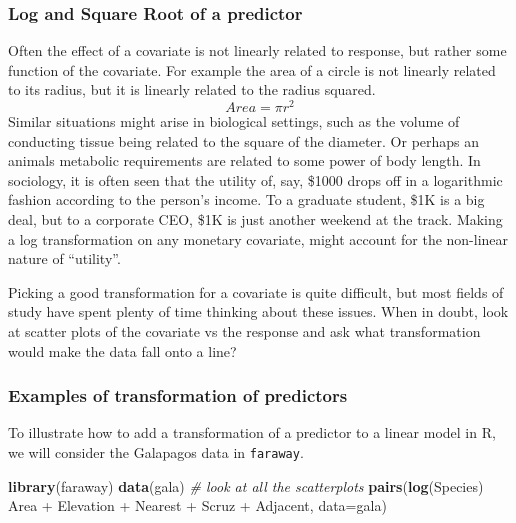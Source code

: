 \documentclass[]{book}
\newenvironment{Shaded}{\begin{snugshade}}{\end{snugshade}}
\newcommand{\KeywordTok}[1]{\textcolor[rgb]{0.13,0.29,0.53}{\textbf{{#1}}}}
\newcommand{\DataTypeTok}[1]{\textcolor[rgb]{0.13,0.29,0.53}{{#1}}}
\newcommand{\StringTok}[1]{\textcolor[rgb]{0.31,0.60,0.02}{{#1}}}
\newcommand{\CommentTok}[1]{\textcolor[rgb]{0.56,0.35,0.01}{\textit{{#1}}}}
\newcommand{\NormalTok}[1]{{#1}}
\theoremstyle{definition}
\theoremstyle{definition}
\theoremstyle{remark}
\begin{document}
\subsubsection{Log and Square Root of a
predictor}\label{log-and-square-root-of-a-predictor}

Often the effect of a covariate is not linearly related to response, but
rather some function of the covariate. For example the area of a circle
is not linearly related to its radius, but it is linearly related to the
radius squared. \[Area=\pi r^{2}\] Similar situations might arise in
biological settings, such as the volume of conducting tissue being
related to the square of the diameter. Or perhaps an animals metabolic
requirements are related to some power of body length. In sociology, it
is often seen that the utility of, say, \$1000 drops off in a
logarithmic fashion according to the person's income. To a graduate
student, \$1K is a big deal, but to a corporate CEO, \$1K is just
another weekend at the track. Making a log transformation on any
monetary covariate, might account for the non-linear nature of
``utility''.

Picking a good transformation for a covariate is quite difficult, but
most fields of study have spent plenty of time thinking about these
issues. When in doubt, look at scatter plots of the covariate vs the
response and ask what transformation would make the data fall onto a
line?

\subsubsection{Examples of transformation of
predictors}\label{examples-of-transformation-of-predictors}

To illustrate how to add a transformation of a predictor to a linear
model in R, we will consider the Galapagos data in \texttt{faraway}.

\begin{Shaded}
\begin{Highlighting}[]
\KeywordTok{library}\NormalTok{(faraway)}
\KeywordTok{data}\NormalTok{(gala)}
\CommentTok{# look at all the scatterplots}
\KeywordTok{pairs}\NormalTok{(}\KeywordTok{log}\NormalTok{(Species) ~}\StringTok{ }\NormalTok{Area +}\StringTok{ }\NormalTok{Elevation +}\StringTok{ }\NormalTok{Nearest +}\StringTok{ }\NormalTok{Scruz +}\StringTok{ }\NormalTok{Adjacent, }\DataTypeTok{data=}\NormalTok{gala)}
\end{Highlighting}
\end{Shaded}
\end{document}
